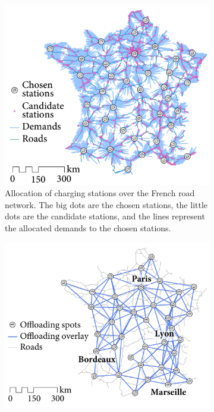 \begin{figure}[ht]
    \centering
    \begin{subfigure}[t]{0.4\columnwidth}
            \centering
            \includegraphics[width=\textwidth]{figures/France-allocation-charging-stations.pdf}
            \caption{Allocation of charging stations over the French road network. The big dots are the chosen stations, the little dots are the candidate stations, and the lines represent the allocated demands to the chosen stations.}
            \label{fig:France-location-allocation}
    \end{subfigure}%
    \quad %
    \begin{subfigure}[t]{0.47\columnwidth}
            \centering
            \includegraphics[width=\textwidth]{figures/France-overlay-wo-capacity.pdf}

\end{subfigure}
\end{figure}
